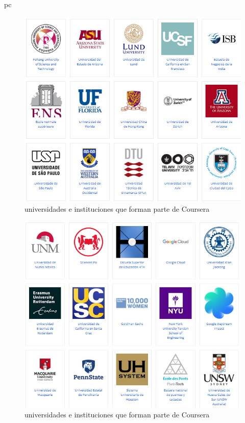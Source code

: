 pc\documentclass[a4paper,12pt,openany]{book}
\begin{document}
\begin{figure}[H]
  \centering
	\includegraphics[width=12cm]{coursera10-7.png}
\caption{universidades e instituciones que forman parte de Coursera}
  \label{fig:cour10-7}
\end{figure}

\begin{figure}[H]
  \centering
	\includegraphics[width=12cm]{coursera10-8.png}
\caption{universidades e instituciones que forman parte de Coursera}
  \label{fig:cour10-8}
\end{figure}
\end{document}

